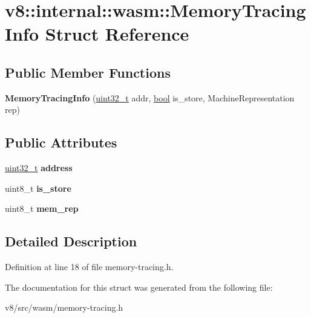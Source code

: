 \hypertarget{structv8_1_1internal_1_1wasm_1_1MemoryTracingInfo}{}\section{v8\+:\+:internal\+:\+:wasm\+:\+:Memory\+Tracing\+Info Struct Reference}
\label{structv8_1_1internal_1_1wasm_1_1MemoryTracingInfo}
\subsection*{Public Member Functions}
\begin{DoxyCompactItemize}
\item 
\mbox{\label{structv8_1_1internal_1_1wasm_1_1MemoryTracingInfo_a0e77c9e56a87d25c32fde38898665881}} 
{\bfseries Memory\+Tracing\+Info} (\mbox{\hyperlink{classuint32__t}{uint32\+\_\+t}} addr, \mbox{\hyperlink{classbool}{bool}} is\+\_\+store, Machine\+Representation rep)
\end{DoxyCompactItemize}
\subsection*{Public Attributes}
\begin{DoxyCompactItemize}
\item 
\mbox{\label{structv8_1_1internal_1_1wasm_1_1MemoryTracingInfo_af0ec5fe0f5d5e4f72e4b6967401c9997}} 
\mbox{\hyperlink{classuint32__t}{uint32\+\_\+t}} {\bfseries address}
\item 
\mbox{\label{structv8_1_1internal_1_1wasm_1_1MemoryTracingInfo_a85ace026de31007fc9853d4ac782d700}} 
uint8\+\_\+t {\bfseries is\+\_\+store}
\item 
\mbox{\label{structv8_1_1internal_1_1wasm_1_1MemoryTracingInfo_aa7f7071d31314150f5c6a8e301dcabff}} 
uint8\+\_\+t {\bfseries mem\+\_\+rep}
\end{DoxyCompactItemize}


\subsection{Detailed Description}


Definition at line 18 of file memory-\/tracing.\+h.



The documentation for this struct was generated from the following file\+:\begin{DoxyCompactItemize}
\item 
v8/src/wasm/memory-\/tracing.\+h\end{DoxyCompactItemize}
